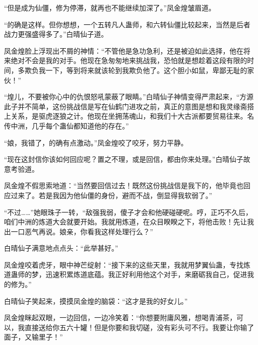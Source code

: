 \begin{this_body}
“但是成为仙僵，修为停滞，就再也不能继续加深了。”凤金煌皱眉道。

“的确是这样。但你想想，一个五转凡人蛊师，和六转仙僵比较起来，当然是后者战力更强盛得多了。”白晴仙子道。

凤金煌脸上浮现出不屑的神情：“不管他是急功急利，还是被迫如此选择，他在将来绝对不会是我的对手。他现在急匆匆地来挑战我，恐怕就是想趁着这段有限的时间，多欺负我一下，等到将来就该轮到我欺负他了。这个胆小如鼠，卑鄙无耻的家伙！”

“煌儿，不要被你心中的仇恨怒吼蒙蔽了眼睛。”白晴仙子神情变得严肃起来，“方源此子并不简单，这份挑战信是写在仙鹤门进攻之前，真正的意图是想和我灵缘斋搭上关系，是驱虎逐狼之计。他现在坐拥荡魂山，和我们十大古派都要贸易往来。名传中洲，几乎每个蛊仙都知道他的存在。”

“娘，我错了，的确有点激动。”凤金煌咬了咬牙，努力平静。

“现在这封信你该如何回应呢？置之不理，或是回信，都由你来处理。”白晴仙子故意考验道。

凤金煌不假思索地道：“当然要回信过去！既然这份挑战信是我下的，他毕竟也回应过来了。若是我因为他仙僵的身份，避而不战，倒显得我软弱了。”

“不过……”她眼珠子一转，“敌强我弱，傻子才会和他硬碰硬呢。哼，正巧不久后，咱们中洲的炼道大会就要开始。我就用炼道，在众目睽睽之下，将他击败！先让我出一口恶气再说。娘亲，你看我这样处理行么？”

白晴仙子满意地点点头：“此举甚好。”

凤金煌咬着虎牙，眼中神芒绽射：“接下来的这些天里，我就用梦翼仙蛊，专找炼道蛊师的梦，迅速积累炼道底蕴。我正好利用他这个对手，来磨砺我自己，促进我的修为。”

白晴仙子笑起来，摸摸凤金煌的脑袋：“这才是我的好女儿。”

凤金煌眯起双眼，一边回信，一边冷笑着：“你想要附庸风雅，想喝青浦茶，可以，我直接送给你五六十罐！但是你要和我切磋，没有彩头可不行。我要让你输了面子，又输里子！”

\end{this_body}

